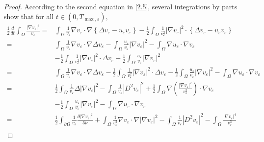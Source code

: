 \documentclass[12pt]{article}
\theoremstyle{plain}
\theoremstyle{definition}
\numberwithin{equation}{section}
\begin{document}
\begin{proof} According  to the second equation in \eqref{2.5}, several integrations by parts show that
for all $t \in\left(0, T_{\max, \varepsilon}\right)$,
\begin{align*}
\frac{1}{2} \frac{d}{dt} \int_{\Omega} \frac{\left|\nabla v_{\varepsilon}\right|^2}{v_{\varepsilon}}
= & \int_{\Omega} \frac{1}{v_{\varepsilon}} \nabla v_{\varepsilon} \cdot \nabla\left\{\Delta v_{\varepsilon}
    -u_{\varepsilon} v_{\varepsilon}\right\}
    -\frac{1}{2} \int_{\Omega} \frac{1}{v_{\varepsilon}^2}\left|\nabla v_{\varepsilon}\right|^2 \cdot\left\{\Delta
    v_{\varepsilon}-u_{\varepsilon} v_{\varepsilon}\right\} \nonumber\\
= & \int_{\Omega} \frac{1}{v_{\varepsilon}} \nabla v_{\varepsilon} \cdot \nabla\Delta v_{\varepsilon}
    -\int_{\Omega} \frac{u_{\varepsilon}}{v_{\varepsilon}}\left|\nabla v_{\varepsilon}\right|^2
    -\int_{\Omega} \nabla u_{\varepsilon} \cdot \nabla v_{\varepsilon}\nonumber\\
  & -\frac{1}{2} \int_{\Omega} \frac{1}{v_{\varepsilon}^2}\left|\nabla v_{\varepsilon}\right|^2 \cdot\Delta v_{\varepsilon}
    +\frac{1}{2} \int_{\Omega} \frac{u_{\varepsilon}}{v_{\varepsilon}}\left|\nabla v_{\varepsilon}\right|^2\nonumber\\
= & \int_{\Omega} \frac{1}{v_{\varepsilon}} \nabla v_{\varepsilon} \cdot \nabla\Delta v_{\varepsilon}
    -\frac{1}{2} \int_{\Omega} \frac{1}{v_{\varepsilon}^2}\left |\nabla v_{\varepsilon}\right|^2 \cdot\Delta v_{\varepsilon}-\frac{1}{2}
    \int_{\Omega} \frac{u_{\varepsilon}}{v_{\varepsilon}}\left|\nabla v_{\varepsilon}\right|^2
    -\int_{\Omega} \nabla u_{\varepsilon} \cdot \nabla v_{\varepsilon}\nonumber\\
 = & \frac{1}{2}\int_{\Omega} \frac{1}{v_{\varepsilon}}\Delta |\nabla v_{\varepsilon}|^2-\int_{\Omega} \frac{1}{v_{\varepsilon}}|D^2
 v_{\varepsilon}|^2+ \frac{1}{2}\int_{\Omega} \nabla ( \frac{|\nabla v_{\varepsilon}|^2}{v_{\varepsilon}^2} ) \cdot\nabla
 v_{\varepsilon}\nonumber\\
 &-\frac{1}{2} \int_{\Omega} \frac{u_{\varepsilon}}{v_{\varepsilon}}\left|\nabla v_{\varepsilon}\right|^2
    -\int_{\Omega} \nabla u_{\varepsilon} \cdot \nabla v_{\varepsilon}\nonumber\\
 = &\frac{1}{2} \int_{\partial \Omega} \frac{1}{v_{\varepsilon}} \frac{\partial|\nabla v_{\varepsilon}|^2}{\partial
 \nu}+\int_{\Omega}\frac{1}{v_{\varepsilon}^2} \nabla v_{\varepsilon}\cdot \nabla |\nabla v_{\varepsilon}|^2 -\int_{\Omega}
 \frac{1}{v_{\varepsilon}}|D^2 v_{\varepsilon}|^2-\int_{\Omega} \frac{|\nabla v_{\varepsilon}|^4}{ v_{\varepsilon}^3}\nonumber\\

\end{align*}
\end{proof}
\end{document}
